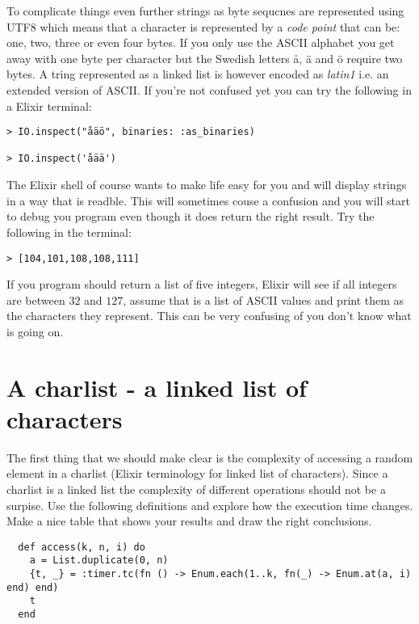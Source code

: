 \documentclass[a4paper,11pt]{article}
\begin{document}
To complicate things even further strings as byte sequcnes are
represented using UTF8 which means that a character is represented by
a {\em code point} that can be: one, two, three or even four bytes. If
you only use the ASCII alphabet you get away with one byte per
character but the Swedish letters å, ä and ö require two bytes. A
tring represented as a linked list is however encoded as {\em latin1}
i.e. an extended version of ASCII. If you're not confused yet you can
try the following in a Elixir terminal:

\begin{verbatim}
> IO.inspect("åäö", binaries: :as_binaries)

> IO.inspect('åää')

\end{verbatim}

The Elixir shell of course wants to make life easy for you and will
display strings in a way that is readble. This will sometimes couse a
confusion and you will start to debug you program even though it does
return the right result. Try the following in the terminal:

\begin{verbatim}
> [104,101,108,108,111]

\end{verbatim}

If you program should return a list of five integers, Elixir will see
if all integers are between $32$ and $127$, assume that is a list of
ASCII values and print them as the characters they represent. This can
be very confusing of you don't know what is going on.


\section{A charlist - a linked list of characters}

The first thing that we should make clear is the complexity of
accessing a random element in a charlist (Elixir terminology for
linked list of characters). Since a charlist is a linked list the
complexity of different operations should not be a surpise. Use the
following definitions and explore how the execution time changes. Make
a nice table that shows your results and draw the right conclusions. 


\begin{verbatim}
  def access(k, n, i) do
    a = List.duplicate(0, n)
    {t, _} = :timer.tc(fn () -> Enum.each(1..k, fn(_) -> Enum.at(a, i) end) end)
    t
  end
\end{verbatim}
\end{document}
